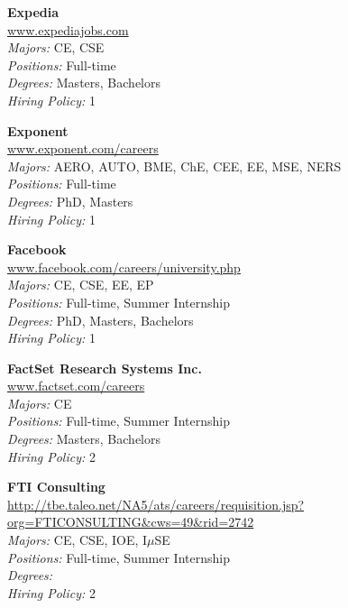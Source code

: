 \documentclass{article}
\begin{document}
\begin{center}
\begin{multicols}{3}
\begin{minipage}{.9\columnwidth}{\Large\bf Expedia }\\
	\url{www.expediajobs.com}\\
	\emph{Majors:} CE, CSE\\
	\emph{Positions:} Full-time\\
	\emph{Degrees:} Masters, Bachelors\\
	\emph{Hiring Policy:} 1\\
\end{minipage}
 
\begin{minipage}{.9\columnwidth}{\Large\bf Exponent }\\
	\url{www.exponent.com/careers}\\
	\emph{Majors:} AERO, AUTO, BME, ChE, CEE, EE, MSE, NERS\\
	\emph{Positions:} Full-time\\
	\emph{Degrees:} PhD, Masters\\
	\emph{Hiring Policy:} 1\\
\end{minipage}
 
\begin{minipage}{.9\columnwidth}{\Large\bf Facebook }\\
	\url{www.facebook.com/careers/university.php}\\
	\emph{Majors:} CE, CSE, EE, EP\\
	\emph{Positions:} Full-time, Summer Internship\\
	\emph{Degrees:} PhD, Masters, Bachelors\\
	\emph{Hiring Policy:} 1\\
\end{minipage}
 
\begin{minipage}{.9\columnwidth}{\Large\bf FactSet Research Systems Inc. }\\
	\url{www.factset.com/careers}\\
	\emph{Majors:} CE\\
	\emph{Positions:} Full-time, Summer Internship\\
	\emph{Degrees:} Masters, Bachelors\\
	\emph{Hiring Policy:} 2\\
\end{minipage}
 
\begin{minipage}{.9\columnwidth}{\Large\bf FTI Consulting }\\
	\url{http://tbe.taleo.net/NA5/ats/careers/requisition.jsp?org=FTICONSULTING&cws=49&rid=2742}\\
	\emph{Majors:} CE, CSE, IOE, I$\mu$SE\\
	\emph{Positions:} Full-time, Summer Internship\\
	\emph{Degrees:} \\
	\emph{Hiring Policy:} 2\\
\end{minipage}
 

\end{multicols}
\end{center}
\end{document}
